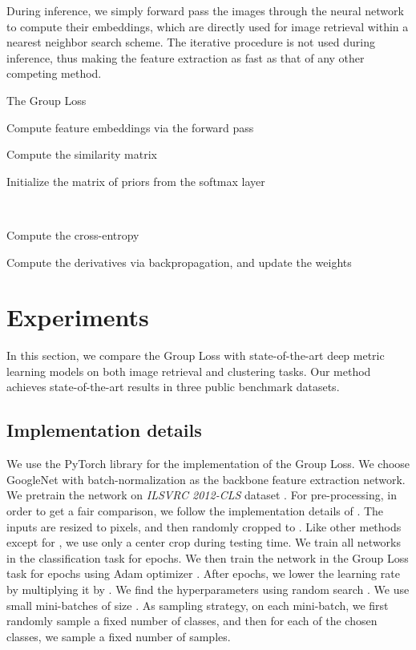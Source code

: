 \documentclass[runningheads]{llncs}
\begin{document}
During inference, we simply forward pass the images through the neural network
to compute their embeddings, which are directly used for image retrieval within a nearest neighbor search scheme.
The iterative procedure is not used during inference, thus making the feature extraction as fast as that of any other competing method. 


\begin{algorithm}[t] 
\caption{The Group Loss}
\label{algo}
\DontPrintSemicolon 
  
  Compute feature embeddings  via the forward pass
  
  
  Compute the similarity matrix 
  
  Initialize the matrix of priors  from the softmax layer
  
  {
    \\
    
  }
      
  Compute the cross-entropy 
  
  Compute the derivatives  via backpropagation, and update the weights 
\end{algorithm} 
\section{Experiments}
In this section, we compare the Group Loss with state-of-the-art deep metric learning models on both image retrieval and clustering tasks. Our method achieves state-of-the-art results in three public benchmark datasets. 

\subsection{Implementation details}
We use the PyTorch \cite{Paszke17} library for the implementation of the Group Loss. We choose GoogleNet \cite{DBLP:conf/cvpr/SzegedyLJSRAEVR15} with batch-normalization \cite{DBLP:conf/icml/IoffeS15} as the backbone feature extraction network. We pretrain the network on \textit{ILSVRC 2012-CLS} dataset \cite{DBLP:journals/corr/RussakovskyDSKSMHKKBBF14}. For pre-processing, in order to get a fair comparison, we follow the implementation details of \cite{DBLP:conf/cvpr/SongJR017}. The inputs are resized to  pixels, and then randomly cropped to . Like other methods except for \cite{DBLP:conf/nips/Sohn16}, we use only a center crop during testing time. We train all networks in the classification task for  epochs. We then train the network in the Group Loss task for  epochs using Adam optimizer \cite{DBLP:conf/iclr/Kingma14}. After  epochs, we lower the learning rate by multiplying it by . We find the hyperparameters using random search \cite{DBLP:journals/jmlr/BergstraB12}. We use small mini-batches of size . As sampling strategy, on each mini-batch, we first randomly sample a fixed number of classes, and then for each of the chosen classes, we sample a fixed number of samples.
\end{document}
